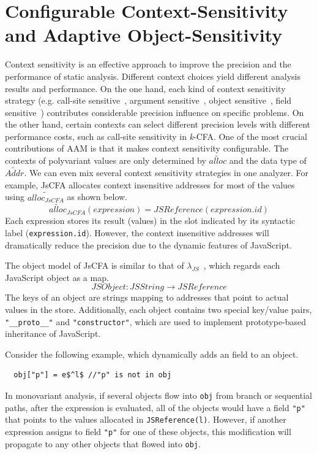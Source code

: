 \documentclass[12pt]{report}
\begin{document}
\section{Configurable Context-Sensitivity and Adaptive Object-Sensitivity}
\label{sub:Configureable}
Context sensitivity is an effective approach to improve the precision and the performance of static analysis.
Different context choices yield different analysis results and performance.
On the one hand, each kind of context sensitivity strategy (e.g. call-site sensitive~\cite{shivers1991control}, argument sensitive~\cite{agesen1995cartesian}, object sensitive~\cite{milanova2005parameterized, smaragdakis2011pick}, field sensitive~\cite{lhotak2003scaling}) contributes considerable precision influence on specific problems.
On the other hand, certain contexts can select different precision levels with different performance costs, such as call-site sensitivity in \textit{k}-CFA\@.
One of the most crucial contributions of AAM is that it makes context sensitivity configurable.
The contexts of polyvariant values are only determined by $\widetilde{alloc}$ and the data type of $\widetilde{Addr}$. %
We can even mix several context sensitivity strategies in one analyzer.
For example, JsCFA allocates context insensitive addresses for most of the values using $\widetilde{alloc_{JsCFA}}$ as shown below.
\[
\widetilde{alloc}_{JsCFA}(expression) = JSReference(expression.id)
\]
Each expression stores its result (values) in the slot indicated by its syntactic label (\verb|expression.id|).
However, the context insensitive addresses will dramatically reduce the precision due to the dynamic features of JavaScript.

The object model of JsCFA is similar to that of $\lambda_{JS}$~\cite{guha2010essence}, which regards each JavaScript object as a map.
\[
JSObject : JSString \to JSReference
\]
The keys of an object are strings mapping to addresses that point to actual values in the store.
Additionally, each object contains two special key/value pairs, \verb|"__proto__"| and \verb|"constructor"|,
which are used to implement prototype-based inheritance of JavaScript.

Consider the following example, which dynamically adds an field to an object.
\lstset{mathescape}
\begin{lstlisting}
  obj["p"] = e$^l$ //"p" is not in obj
\end{lstlisting}
In monovariant analysis, if several objects flow into \verb|obj| from branch or sequential paths, after the expression is evaluated, all of the objects would have a field \verb|"p"| that points to the values allocated in \verb|JSReference(l)|.
However, if another expression assigns to field \verb|"p"| for one of these objects, this modification will propagate to any other objects that flowed into \verb|obj|.
\end{document}
